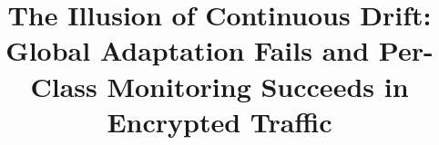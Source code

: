 \newcommand{\TODO}[1]{}

\newenvironment{plan}{%
  \par\smallskip\noindent\textcolor{blue}{\textbf{$\blacktriangleright$\,Plan / talking points:}}\par
  \begin{itemize}[leftmargin=1.4em,itemsep=1pt,topsep=2pt,parsep=0pt]%
}{%
  \end{itemize}\smallskip%
}

\def\BibTeX{{\rm B\kern-.05em{\sc i\kern-.025em b}\kern-.08em
    T\kern-.1667em\lower.7ex\hbox{E}\kern-.125emX}}



\title{The Illusion of Continuous Drift: Global Adaptation Fails and
Per-Class Monitoring Succeeds in Encrypted Traffic}

\author{
}

\maketitle

